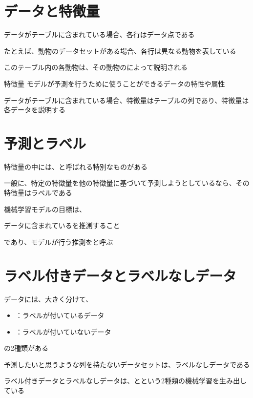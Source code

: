\documentclass[../../../topic_machine-learning]{subfiles}
\begin{document}
\sectionline
\section{データと特徴量}

データがテーブルに含まれている場合、各行はデータ点である

たとえば、動物のデータセットがある場合、各行は異なる動物を表している

\br

このテーブル内の各動物は、その動物のによって説明される

\begin{definition}{特徴量}
  モデルが予測を行うために使うことができるデータの特性や属性
\end{definition}

データがテーブルに含まれている場合、特徴量はテーブルの列であり、特徴量は各データを説明する

\sectionline
\section{予測とラベル}

特徴量の中には、と呼ばれる特別なものがある

一般に、特定の特徴量を他の特徴量に基づいて予測しようとしているなら、その特徴量はラベルである

\br

機械学習モデルの目標は、
\begin{shaded}
  データに含まれているを推測すること
\end{shaded}
であり、モデルが行う推測をと呼ぶ

\sectionline
\section{ラベル付きデータとラベルなしデータ}

データには、大きく分けて、
\begin{itemize}
  \item {}：ラベルが付いているデータ
  \item {}：ラベルが付いていないデータ
\end{itemize}
の2種類がある

\br

予測したいと思うような列を持たないデータセットは、ラベルなしデータである

\br

ラベル付きデータとラベルなしデータは、とという2種類の機械学習を生み出している
\end{document}
